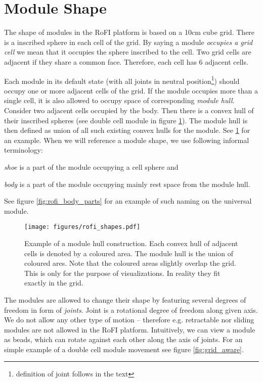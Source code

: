 \section{Module Shape}\label{sec:aware}

The shape of modules in the RoFI platform is based on a 10cm cube grid. There is
a inscribed sphere in each cell of the grid. By saying a module \emph{occupies a
grid cell} we mean that it occupies the sphere inscribed to the cell. Two grid
cells are adjacent if they share a common face. Therefore, each cell has 6
adjacent cells.

Each module in its default state (with all joints in neutral
position\footnote{definition of joint follows in the text}) should occupy one or
more adjacent cells of the grid. If the module occupies more than a single cell,
it is also allowed to occupy space of corresponding \emph{module hull}. Consider
two adjacent cells occupied by the body. Then there is a convex hull of their
inscribed spheres (see double cell module in figure \ref{fig:rofi_shapes}). The
module hull is then defined as union of all such existing convex hulls for the
module. See \ref{fig:rofi_shapes} for an example. When we will reference a
module shape, we use following informal terminology:
\begin{itemize*}
    \item \emph{shoe} is a part of the module occupying a cell sphere and
    \item \emph{body} is a part of the module occupying mainly rest space from
    the module hull.
\end{itemize*}
See figure \ref{fig:rofi_body_parts} for an example of such naming on the
universal module.

\begin{figure}[h!]
    \centering
    \texttt{[image: figures/rofi\_shapes.pdf]}
    \caption{Example of a module hull construction. Each convex hull of adjacent
    cells is denoted by a coloured area. The module hull is the union of coloured
    ares. Note that the coloured areas slightly overlap the grid. This is only
    for the purpose of visualizations. In reality they fit exactly in the grid.}
    \label{fig:rofi_shapes}
\end{figure}

The modules are allowed to change their shape by featuring several degrees of
freedom in form of \emph{joints}. Joint is a rotational degree of freedom along
given axis. We do not allow any other type of motion -- therefore e.g.
retractable nor sliding modules are not allowed in the RoFI platform.
Intuitively, we can view a module as beads, which can rotate against each other
along the axis of joints. For an simple example of a double cell module movement
see figure \ref{fig:grid_aware}.

